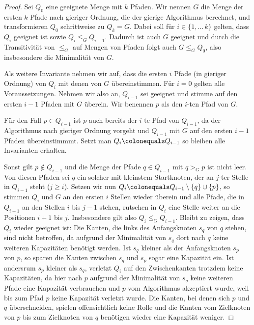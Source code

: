 \begin{proof}
    Sei $Q_0$ eine geeignete Menge mit $k$ Pfaden.
    Wir nennen $G$ die Menge der ersten $k$ Pfade nach gieriger Ordnung, die der gierige Algorithmus berechnet, und
    transformieren $Q_0$ schrittweise zu $Q_k = G$.
    Dabei soll für $i \in \{1,\dots\,k\}$ gelten, dass $Q_i$ geeignet ist sowie $Q_i \leq_G Q_{i-1}$.
    Dadurch ist auch $G$ geeignet und durch die Transitivität von $\leq_G$ auf Mengen von Pfaden folgt auch $G \leq_G Q_0$,
    also insbesondere die Minimalität von $G$.

    Als weitere Invariante nehmen wir auf, dass die ersten $i$ Pfade (in gieriger Ordnung) von $Q_i$ mit denen von $G$
    übereinstimmen.
    Für $i=0$ gelten alle Voraussetzungen.
    Nehmen wir also an, $Q_{i-1}$ sei geeignet und stimme auf den ersten $i-1$ Pfaden mit $G$ überein.
    Wir benennen $p$ als den $i$-ten Pfad von $G$.

    Für den Fall $p \in Q_{i-1}$ ist $p$ auch bereits der $i$-te Pfad von $Q_{i-1}$, da der Algorithmus nach
    gieriger Ordnung vorgeht und $Q_{i-1}$ mit $G$ auf den ersten $i-1$ Pfaden übereinstimmmt.
    Setzt man $Q_i \colonequals Q_{i-1}$ so bleiben alle Invarianten erhalten.

    Sonst gilt $p \notin Q_{i-1}$ und die Menge der Pfade $q \in Q_{i-1}$ mit $q >_G p$ ist nicht leer.
    Von diesen Pfaden sei $q$ ein solcher mit kleinstem Startknoten, der an $j$-ter Stelle in $Q_{i-1}$ steht
    ($j \geq i$).
    Setzen wir nun $Q_{i} \colonequals Q_{i-1} \setminus \{ q \} \cup \{ p \}$, so stimmen $Q_{i}$ und $G$ an den
    ersten $i$ Stellen wieder überein und alle Pfade, die in $Q_{i-1}$ an den Stellen $i$ bis $j-1$ stehen, rutschen
    in $Q_i$ eine Stelle weiter an die Positionen $i+1$ bis $j$.
    Insbesondere gilt also $Q_i \leq_G Q_{i-1}$.
    Bleibt zu zeigen, dass $Q_i$ wieder geeignet ist:
    Die Kanten, die links des Anfangsknoten $s_q$ von $q$ stehen, sind nicht betroffen, da aufgrund der Minimalität
    von $s_q$ dort nach $q$ keine weiteren Kapazitäten benötigt werden.
    Ist $s_q$ kleiner als der Anfangsknoten $s_p$ von $p$, so sparen die Kanten zwischen $s_q$ und $s_p$ sogar eine
    Kapazität ein.
    Ist andersrum $s_p$ kleiner als $s_q$, verletzt $Q_i$ auf den Zwischenkanten trotzdem keine Kapazitäten, da
    hier nach $p$ aufgrund der Minimalität von $s_q$ keine weiteren Pfade eine Kapazität verbrauchen und $p$ vom
    Algorithmus akzeptiert wurde, weil bis zum Pfad $p$ keine Kapazität verletzt wurde.
    Die Kanten, bei denen sich $p$ und $q$ überschneiden, spielen offensichtlich keine Rolle und die Kanten
    vom Zielknoten von $p$ bis zum Zielknoten von $q$ benötigen wieder eine Kapazität weniger.
\end{proof}

